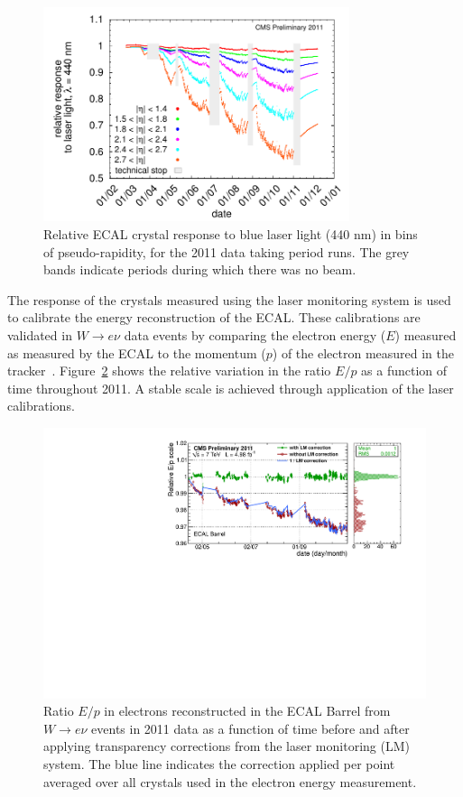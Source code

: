 \begin{figure}
	\centering
	\includegraphics[width=0.8\textwidth]{detector/ecal/laser.pdf}
	\caption{Relative ECAL crystal response to blue laser light (440 nm) in bins of pseudo-rapidity, 
	for the 2011 data taking period runs. The grey bands indicate periods during which there was no beam.}
	\label{fig:trans}
\end{figure}

The response of the crystals measured using the laser monitoring system is used to calibrate 
the energy reconstruction of the ECAL. These calibrations are validated in $W\rightarrow e\nu$ data events
by comparing the electron energy ($E$) measured as measured by the ECAL to the momentum 
($p$) of the electron measured in the tracker~\citep{CMS-DP-2012-007}. 
Figure~\ref{fig:scaleeop} shows the relative variation in the ratio $E/p$ as a function of time 
throughout 2011. A stable scale is achieved through application of the laser calibrations.

\begin{figure}
	\centering
	\includegraphics[width=\textwidth]{detector/ecal/scaleeop.pdf}
	\caption{Ratio $E/p$ in electrons reconstructed in the ECAL Barrel 
	from $W\rightarrow e\nu$ events in 2011 data as a function of time before 
	and after applying transparency corrections from the laser monitoring (LM) system. 
	The blue line indicates the correction applied per point averaged over all crystals used in the electron
	energy measurement.}
	\label{fig:scaleeop}
\end{figure}

